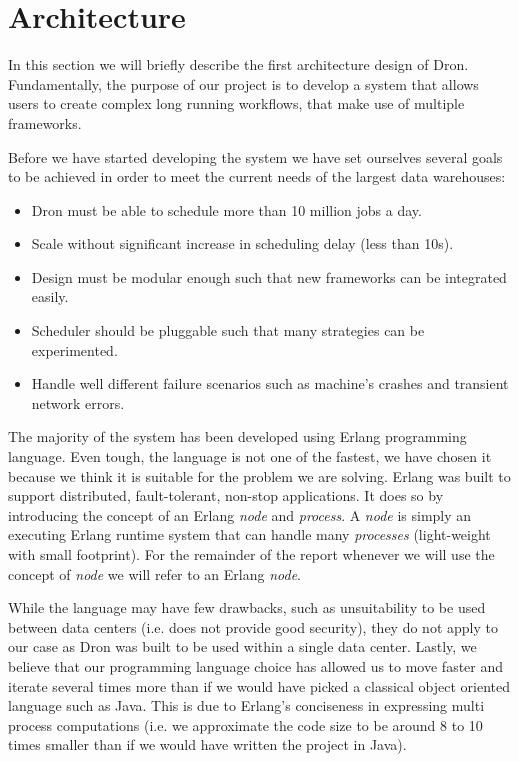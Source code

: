 \documentclass[11pt,a4paper,twoside]{report}
\begin{document}
\section{Architecture}
In this section we will briefly describe the first architecture design of Dron. Fundamentally, the purpose of our project is to develop a system that allows users to create complex long running workflows, that make use of multiple frameworks.


Before we have started developing the system we have set ourselves several goals to be achieved in order to meet the current needs of the largest data warehouses:

\begin{itemize}
\item{}
Dron must be able to schedule more than 10 million jobs a day.
\item{}
Scale without significant increase in scheduling delay (less than 10s).
\item{}
Design must be modular enough such that new frameworks can be integrated easily.
\item{}
Scheduler should be pluggable such that many strategies can be experimented.
\item{}
Handle well different failure scenarios such as machine's crashes and transient network errors.
\end{itemize}


The majority of the system has been developed using Erlang programming language. Even tough, the language is not one of the fastest, we have chosen it because we think it is suitable for the problem we are solving. Erlang was built to support distributed, fault-tolerant, non-stop applications. It does so by introducing the concept of an Erlang \textit{node} and \textit{process}. A \textit{node} is simply an executing Erlang runtime system that can handle many \textit{processes} (light-weight with small footprint). For the remainder of the report whenever we will use the concept of \textit{node} we will refer to an Erlang \textit{node}.


While the language may have few drawbacks, such as unsuitability to be used between data centers (i.e. does not provide good security), they do not apply to our case as Dron was built to be used within a single data center. Lastly, we believe that our programming language choice has allowed us to move faster and iterate several times more than if we would have picked a classical object oriented language such as Java. This is due to Erlang's conciseness in expressing multi process computations (i.e. we approximate the code size to be around 8 to 10 times smaller than if we would have written the project in Java).
\end{document}
